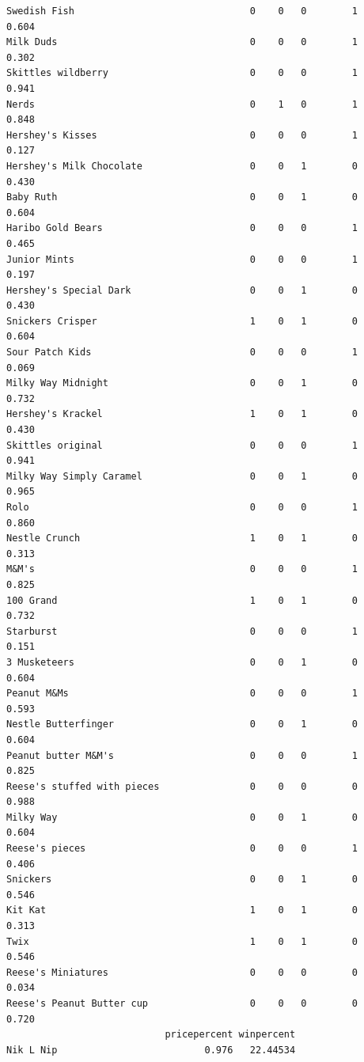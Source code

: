\documentclass[
  letterpaper,
  DIV=11,
  numbers=noendperiod]{scrartcl}
\begin{document}
\begin{verbatim}
Swedish Fish                               0    0   0        1        0.604
Milk Duds                                  0    0   0        1        0.302
Skittles wildberry                         0    0   0        1        0.941
Nerds                                      0    1   0        1        0.848
Hershey's Kisses                           0    0   0        1        0.127
Hershey's Milk Chocolate                   0    0   1        0        0.430
Baby Ruth                                  0    0   1        0        0.604
Haribo Gold Bears                          0    0   0        1        0.465
Junior Mints                               0    0   0        1        0.197
Hershey's Special Dark                     0    0   1        0        0.430
Snickers Crisper                           1    0   1        0        0.604
Sour Patch Kids                            0    0   0        1        0.069
Milky Way Midnight                         0    0   1        0        0.732
Hershey's Krackel                          1    0   1        0        0.430
Skittles original                          0    0   0        1        0.941
Milky Way Simply Caramel                   0    0   1        0        0.965
Rolo                                       0    0   0        1        0.860
Nestle Crunch                              1    0   1        0        0.313
M&M's                                      0    0   0        1        0.825
100 Grand                                  1    0   1        0        0.732
Starburst                                  0    0   0        1        0.151
3 Musketeers                               0    0   1        0        0.604
Peanut M&Ms                                0    0   0        1        0.593
Nestle Butterfinger                        0    0   1        0        0.604
Peanut butter M&M's                        0    0   0        1        0.825
Reese's stuffed with pieces                0    0   0        0        0.988
Milky Way                                  0    0   1        0        0.604
Reese's pieces                             0    0   0        1        0.406
Snickers                                   0    0   1        0        0.546
Kit Kat                                    1    0   1        0        0.313
Twix                                       1    0   1        0        0.546
Reese's Miniatures                         0    0   0        0        0.034
Reese's Peanut Butter cup                  0    0   0        0        0.720
                            pricepercent winpercent
Nik L Nip                          0.976   22.44534

\end{verbatim}
\end{document}
